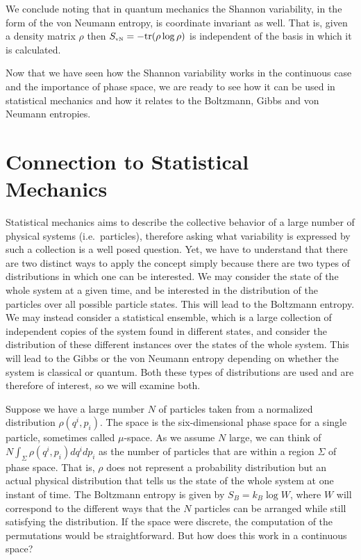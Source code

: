 \documentclass[iopart]{revtex4-1}
\begin{document}
We conclude noting that in quantum mechanics the Shannon variability, in the form of the von Neumann entropy, is coordinate invariant as well. That is, given a density matrix $\rho$ then $S_\textrm{\tiny{vN}} = - \textrm{tr}(\rho \log \rho)$ is independent of the basis in which it is calculated.

Now that we have seen how the Shannon variability works in the continuous case and the importance of phase space, we are ready to see how it can be used in statistical mechanics and how it relates to the Boltzmann, Gibbs and von Neumann entropies.

\section{Connection to Statistical Mechanics\label{csm}}

Statistical mechanics aims to describe the collective behavior of a large number of physical systems (i.e.~particles), therefore asking what variability is expressed by such a collection is a well posed question. Yet, we have to understand that there are two distinct ways to apply the concept simply because there are two types of distributions in which one can be interested. We may consider the state of the whole system at a given time, and be interested in the distribution of the particles over all possible particle states. This will lead to the Boltzmann entropy. We may instead consider a statistical ensemble, which is a large collection of independent copies of the system found in different states, and consider the distribution of these different instances over the states of the whole system. This will lead to the Gibbs or the von Neumann entropy depending on whether the system is classical or quantum. Both these types of distributions are used and are therefore of interest, so we will examine both.

Suppose we have a large number $N$ of particles taken from a normalized distribution $\rho(q^i, p_i)$. The space is the six-dimensional phase space for a single particle, sometimes called $\mu$-space. As we assume $N$ large, we can think of $N\int_\Sigma \rho(q^i, p_i)dq^idp_i$ as the number of particles that are within a region $\Sigma$ of phase space. That is, $\rho$ does not represent a probability distribution but an actual physical distribution that tells us the state of the whole system at one instant of time. The Boltzmann entropy is given by $S_B = k_B \log W$, where $W$ will correspond to the different ways that the $N$ particles can be arranged while still satisfying the distribution. If the space were discrete, the computation of the permutations would be straightforward. But how does this work in a continuous space?
\end{document}

